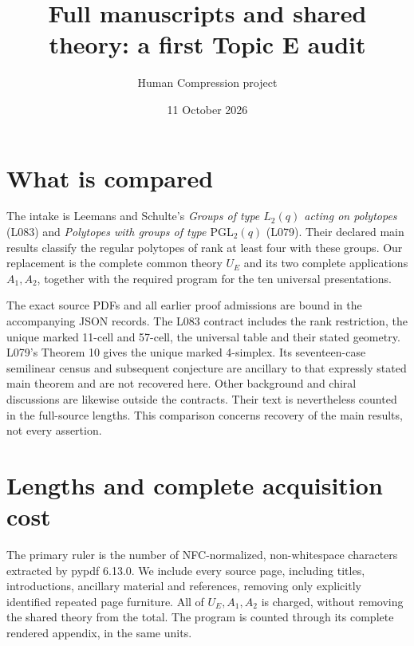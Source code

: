 \documentclass[11pt,a4paper]{article}
\title{Full manuscripts and shared theory: a first Topic E audit}
\author{Human Compression project}
\date{11 October 2026}
\begin{document}
\maketitle
\section{What is compared}
The intake is Leemans and Schulte's \emph{Groups of type $L_2(q)$ acting on
polytopes} (L083) and \emph{Polytopes with groups of type $\mathrm{PGL}_2(q)$}
(L079). Their declared main results classify the regular polytopes of rank
at least four with these groups. Our replacement is the complete common
theory $U_E$ and its two complete applications $A_1,A_2$, together with the
required program for the ten universal presentations.

The exact source PDFs and all earlier proof admissions are bound in the
accompanying JSON records. The L083 contract includes the rank restriction,
the unique marked 11-cell and 57-cell, the universal table and their stated
geometry. L079's Theorem 10 gives the unique marked 4-simplex. Its
seventeen-case semilinear census and subsequent conjecture are ancillary
to that expressly stated main theorem and are not recovered here.
Other background and chiral discussions are likewise outside the
contracts. Their text is nevertheless counted in the full-source lengths.
This comparison concerns recovery of the main results, not every assertion.

\section{Lengths and complete acquisition cost}
The primary ruler is the number of NFC-normalized, non-whitespace
characters extracted by pypdf 6.13.0. We include every source page,
including titles, introductions, ancillary material and references,
removing only explicitly identified repeated page furniture. All of
$U_E,A_1,A_2$ is charged, without removing the shared theory from the
total. The program is counted through its complete rendered appendix,
in the same units.
\end{document}
